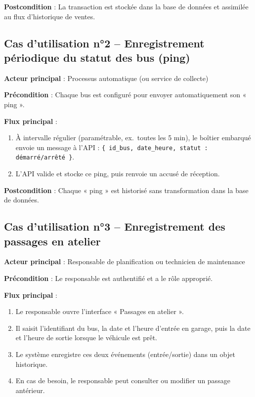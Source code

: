\documentclass[a4paper, 12pt]{book}
\begin{document}
\textbf{Postcondition} : La transaction est stockée dans la base de données et assimilée au flux d'historique de ventes.

\subsection{Cas d'utilisation n°2 – Enregistrement périodique du statut des bus (ping)}

\textbf{Acteur principal} : Processus automatique (ou service de collecte)

\textbf{Précondition} : Chaque bus est configuré pour envoyer automatiquement son « ping ».

\textbf{Flux principal} :
\begin{enumerate}
    \item À intervalle régulier (paramétrable, ex.~toutes les 5 min), le boîtier embarqué envoie un message à l'API : \texttt{\{ id\_bus, date\_heure, statut : démarré/arrêté \}}.
    \item L'API valide et stocke ce ping, puis renvoie un accusé de réception.
\end{enumerate}

\textbf{Postcondition} : Chaque « ping » est historisé sans transformation dans la base de données.

\subsection{Cas d'utilisation n°3 – Enregistrement des passages en atelier}

\textbf{Acteur principal} : Responsable de planification ou technicien de maintenance

\textbf{Précondition} : Le responsable est authentifié et a le rôle approprié.

\textbf{Flux principal} :
\begin{enumerate}
    \item Le responsable ouvre l'interface « Passages en atelier ».
    \item Il saisit l'identifiant du bus, la date et l'heure d'entrée en garage, puis la date et l'heure de sortie lorsque le véhicule est prêt.
    \item Le système enregistre ces deux événements (entrée/sortie) dans un objet historique.
    \item En cas de besoin, le responsable peut consulter ou modifier un passage antérieur.
\end{enumerate}
\end{document}

